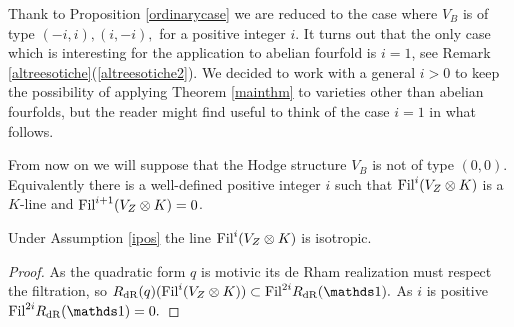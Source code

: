 Thank to Proposition \ref{ordinarycase}  we are reduced to the case where $V_B$ is of type $(-i,i),(i,-i),$ for a positive integer $i$.
 It turns out that the only case which is interesting for the application to abelian fourfold is $i=1$, see Remark \ref{altreesotiche}(\ref{altreesotiche2}). We decided to work with a general $i>0$ to keep the possibility of applying  Theorem \ref{mainthm} to varieties other than abelian fourfolds, but the reader might find useful to think of the case $i=1$ in what follows.

 \begin{assumption}
\notready\label{ipos}
From now on we will suppose that the Hodge structure $V_B$ is not of type $(0,0)$. Equivalently there is a well-defined positive integer $i$ such that $\textnormal{Fil}^i(V_Z\otimes K)$ is a $K$-line and $\textnormal{Fil}^{i+1}(V_Z\otimes K)=0$.
\end{assumption}
 \begin{lemma}
\notready\label{isotrop}
 Under Assumption \ref{ipos} the line
 $\textnormal{Fil}^i(V_Z\otimes K)$ is isotropic.
\end{lemma}
\begin{proof}
As the quadratic form $q$ is motivic its de Rham realization must respect the filtration, so $R_{\dR}(q)(\Fil^i(V_Z\otimes K)) \subset \Fil^{2i}R_{\dR}(\one).$ As $i$ is positive $\Fil^{2i}R_{\dR}(\one) =0.$
\end{proof}

